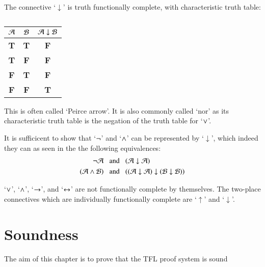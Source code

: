 \documentclass[12pt, a4paper, twoside, openright, titlepage]{book}
\begin{document}
\begin{defn}{}{}
    The connective `$\downarrow$' is truth functionally complete, with characteristic truth table: 
        \begin{table}[H]
            \centering
            \caption{}
            \begin{tabular}{cc|c}
                $\mathcal{A}$ & $\mathcal{B}$ & $\mathcal{A} \downarrow \mathcal{B}$\\ \hline
                \textbf{T} & \textbf{T} & \textbf{F} \\
                \textbf{T} & \textbf{F} & \textbf{F} \\
                \textbf{F} & \textbf{T} & \textbf{F} \\
                \textbf{F} & \textbf{F} & \textbf{T}
            \end{tabular}
        \end{table}
        This is often called `Peirce arrow'. It is also commonly called `nor' as its characteristic truth table is the negation of the truth table for `$\vee$'.
\end{defn}
\begin{proof*}{}{}
    It is sufficicent to show that `$\neg$' and `$\wedge$' can be represented by `$\downarrow$', which indeed they can as seen in the the following equivalences: 
    \begin{align*}
        \neg\mathcal{A}\;\;&\text{ and }\;\;(\mathcal{A}\downarrow \mathcal{A}) \\
        (\mathcal{A}\wedge\mathcal{B})\;\;&\text{ and }\;\;((\mathcal{A}\downarrow\mathcal{A})\downarrow(\mathcal{B}\downarrow\mathcal{B}))
    \end{align*}
\end{proof*}


\begin{thm}{}{}
    `$\vee$', `$\wedge$', `$\rightarrow$', and `$\leftrightarrow$' are not functionally complete by themselves. The  two-place connectives which are individually functionally complete are `$\uparrow$' and `$\downarrow$'.
\end{thm}



\chapter{\textsection\textsection Soundness}

The aim of this chapter is to prove that the TFL proof system is sound
\end{document}
